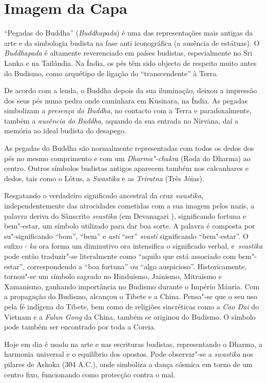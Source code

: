 \chapter{Imagem da Capa}

“Pegadas do Buddha” (\emph{Buddhapada}) é uma das representações mais antigas
da arte e da simbologia budista na fase anti iconográfica (a ausência de
estátuas). O \emph{Buddhapada} é altamente reverenciado em países budistas,
especialmente no Sri Lanka e na Tailândia. Na Índia, os pés têm sido objecto de
respeito muito antes do Budismo, como arquétipo de ligação do “transcendente”
à Terra.

De acordo com a lenda, o Buddha depois da sua iluminação, deixou a impressão dos
seus pés numa pedra onde caminhara em Kusinara, na Índia. As pegadas simbolizam
a \emph{presença do Buddha}, no contacto com a Terra e paradoxalmente, também a
\emph{ausência do Buddha}, aquando da sua entrada no Nirvāna, daí a memória ao
ideal budista do desapego.

As pegadas do Buddha são normalmente representadas com todos os dedos dos pés no
mesmo comprimento e com um \emph{Dharma"-chakra} (Roda do Dharma) ao
centro. Outros símbolos budistas antigos aparecem também nos calcanhares e
dedos, tais como o Lótus, a \emph{Swastika} e as \emph{Triratna} (Três Jóias).

Resgatando o verdadeiro significado ancestral da cruz \emph{swastika},
independentemente das atrocidades cometidas com a sua imagem pelos nazis, a
palavra deriva do Sânscrito \emph{svastika} (em Devanagari ),
significando fortuna e bem"-estar, um símbolo utilizado para dar boa sorte. A
palavra é composta por su"-significando “bom”, “bem” e \emph{asti} “ser”
\emph{svasti} significando “bem"-estar”. O sufixo - \emph{ka} ora forma um
diminutivo ora intensifica o significado verbal, e~\emph{svastika} pode então
traduzir"-se literalmente como “aquilo que está associado com bem"-estar”,
correspondendo a “boa fortuna” ou “algo auspicioso”. Historicamente,
tornou"-se um símbolo sagrado no Hinduísmo, Jainismo, Mitraismo e Xamanismo,
ganhando importância no Budismo durante o Império Máuria. Com a propagação do
Budismo, alcançou o Tibete e a China. Pensa"-se que o seu uso pela fé indígena do
Tibete, bem como de religiões sincréticas como a \emph{Cao Dai} do Vietnam e a
\emph{Falun Gong} da China, também se originou do Budismo. O símbolo pode também
ser encontrado por toda a Coreia.

Hoje em dia é usado na arte e nas escrituras budistas, representando o Dharma,
a harmonia universal e o equilíbrio dos opostos. Pode observar"-se
a \emph{swastika} nos pilares de Ashoka (304 A.C.), onde simboliza a dança
cósmica em torno de um centro fixo, funcionando como protecção contra o mal.

